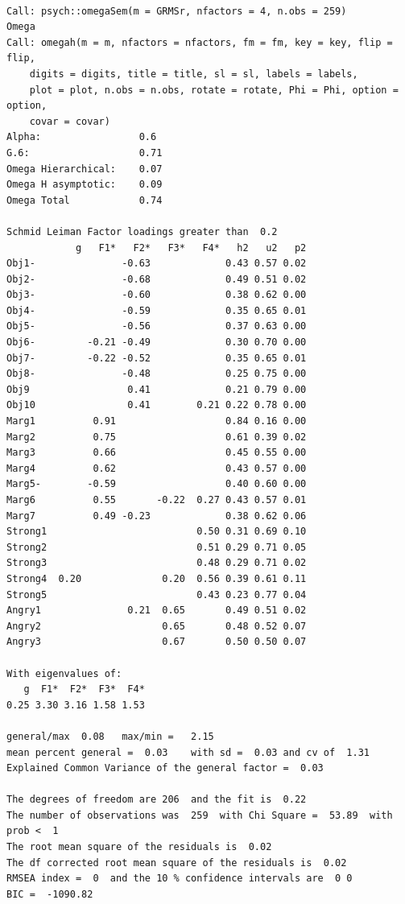 \documentclass[
  english,
]{book}
\begin{document}
\begin{verbatim}
 
Call: psych::omegaSem(m = GRMSr, nfactors = 4, n.obs = 259)
Omega 
Call: omegah(m = m, nfactors = nfactors, fm = fm, key = key, flip = flip, 
    digits = digits, title = title, sl = sl, labels = labels, 
    plot = plot, n.obs = n.obs, rotate = rotate, Phi = Phi, option = option, 
    covar = covar)
Alpha:                 0.6 
G.6:                   0.71 
Omega Hierarchical:    0.07 
Omega H asymptotic:    0.09 
Omega Total            0.74 

Schmid Leiman Factor loadings greater than  0.2 
            g   F1*   F2*   F3*   F4*   h2   u2   p2
Obj1-               -0.63             0.43 0.57 0.02
Obj2-               -0.68             0.49 0.51 0.02
Obj3-               -0.60             0.38 0.62 0.00
Obj4-               -0.59             0.35 0.65 0.01
Obj5-               -0.56             0.37 0.63 0.00
Obj6-         -0.21 -0.49             0.30 0.70 0.00
Obj7-         -0.22 -0.52             0.35 0.65 0.01
Obj8-               -0.48             0.25 0.75 0.00
Obj9                 0.41             0.21 0.79 0.00
Obj10                0.41        0.21 0.22 0.78 0.00
Marg1          0.91                   0.84 0.16 0.00
Marg2          0.75                   0.61 0.39 0.02
Marg3          0.66                   0.45 0.55 0.00
Marg4          0.62                   0.43 0.57 0.00
Marg5-        -0.59                   0.40 0.60 0.00
Marg6          0.55       -0.22  0.27 0.43 0.57 0.01
Marg7          0.49 -0.23             0.38 0.62 0.06
Strong1                          0.50 0.31 0.69 0.10
Strong2                          0.51 0.29 0.71 0.05
Strong3                          0.48 0.29 0.71 0.02
Strong4  0.20              0.20  0.56 0.39 0.61 0.11
Strong5                          0.43 0.23 0.77 0.04
Angry1               0.21  0.65       0.49 0.51 0.02
Angry2                     0.65       0.48 0.52 0.07
Angry3                     0.67       0.50 0.50 0.07

With eigenvalues of:
   g  F1*  F2*  F3*  F4* 
0.25 3.30 3.16 1.58 1.53 

general/max  0.08   max/min =   2.15
mean percent general =  0.03    with sd =  0.03 and cv of  1.31 
Explained Common Variance of the general factor =  0.03 

The degrees of freedom are 206  and the fit is  0.22 
The number of observations was  259  with Chi Square =  53.89  with prob <  1
The root mean square of the residuals is  0.02 
The df corrected root mean square of the residuals is  0.02
RMSEA index =  0  and the 10 % confidence intervals are  0 0
BIC =  -1090.82


\end{verbatim}
\end{document}
